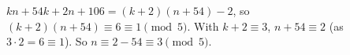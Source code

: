 $kn+54k+2n+106=(k+2)(n+54)-2$, so $(k+2)(n+54)\equiv6\equiv1\pmod5$. With $k+2\equiv3$, $n+54\equiv2$ (as $3\cdot2=6\equiv1$). So $n\equiv2-54\equiv\boxed{3}\pmod5$.
